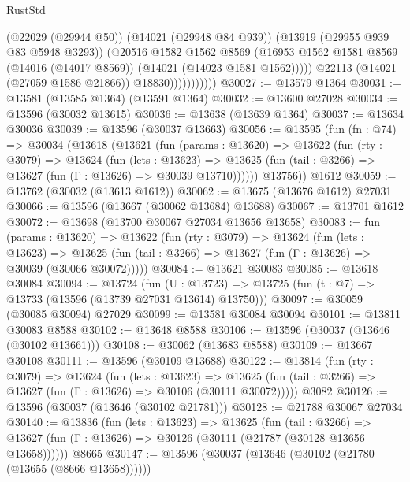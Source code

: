 \begin{lexlean}{RustStd}
\begin{coremodule}
                            (@22029 (@29944 @50))
                            (@14021 (@29948 @84 @939))
                            (@13919 (@29955 @939 @83 @5948 @3293))
                            (@20516
                              @1582
                              @1562
                              @8569
                              (@16953
                                @1562
                                @1581
                                @8569
                                (@14016 (@14017 @8569))
                                (@14021 (@14023 @1581 @1562)))))
                          @22113
                          (@14021 (@27059 @1586 @21866))
                          @18830)))))))))))
@30027 := @13579 @1364
@30031 := @13581 (@13585 @1364) (@13591 @1364)
@30032 := @13600 @27028
@30034 := @13596 (@30032 @13615)
@30036 := @13638 (@13639 @1364)
@30037 := @13634 @30036
@30039 := @13596 (@30037 @13663)
@30056 := @13595
    (fun (fn : @74) =>
    @30034
      (@13618
        (@13621
          (fun (params : @13620) =>
          @13622
            (fun (rty : @3079) =>
            @13624
              (fun (lets : @13623) =>
              @13625 (fun (tail : @3266) => @13627 (fun (Γ : @13626) => @30039 @13710))))))
        @13756))
    @1612
@30059 := @13762 (@30032 (@13613 @1612))
@30062 := @13675 (@13676 @1612) @27031
@30066 := @13596 (@13667 (@30062 @13684) @13688)
@30067 := @13701 @1612
@30072 := @13698 (@13700 @30067 @27034 @13656 @13658)
@30083 := fun (params : @13620) =>
  @13622
    (fun (rty : @3079) =>
    @13624
      (fun (lets : @13623) =>
      @13625 (fun (tail : @3266) => @13627 (fun (Γ : @13626) => @30039 (@30066 @30072)))))
@30084 := @13621 @30083
@30085 := @13618 @30084
@30094 := @13724
    (fun (U : @13723) => @13725 (fun (t : @7) => @13733 (@13596 (@13739 @27031 @13614) @13750)))
@30097 := @30059 (@30085 @30094) @27029
@30099 := @13581 @30084 @30094
@30101 := @13811 @30083 @8588
@30102 := @13648 @8588
@30106 := @13596 (@30037 (@13646 (@30102 @13661)))
@30108 := @30062 (@13683 @8588)
@30109 := @13667 @30108
@30111 := @13596 (@30109 @13688)
@30122 := @13814
    (fun (rty : @3079) =>
    @13624
      (fun (lets : @13623) =>
      @13625 (fun (tail : @3266) => @13627 (fun (Γ : @13626) => @30106 (@30111 @30072)))))
    @3082
@30126 := @13596 (@30037 (@13646 (@30102 @21781)))
@30128 := @21788 @30067 @27034
@30140 := @13836
    (fun (lets : @13623) =>
    @13625
      (fun (tail : @3266) =>
      @13627 (fun (Γ : @13626) => @30126 (@30111 (@21787 (@30128 @13656 @13658))))))
    @8665
@30147 := @13596 (@30037 (@13646 (@30102 (@21780 (@13655 (@8666 @13658))))))

\end{coremodule}
\end{lexlean}
